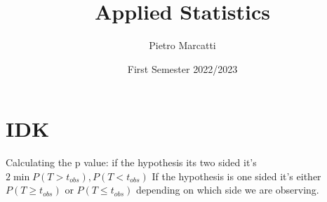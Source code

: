 \documentclass{article}
\title{Applied Statistics}
\author{Pietro Marcatti}
\date{First Semester 2022/2023}
\begin{document}
\maketitle
\section{IDK}
Calculating the p value: if the hypothesis its two sided it's $ 2 \min{P(T>t_{obs}), P(T<t_{obs})} $ If the hypothesis is one sided it's either $ P(T\geq t_{obs}) $ or $ P(T\leq t_{obs}) $ depending on which side we are observing.
\end{document}
